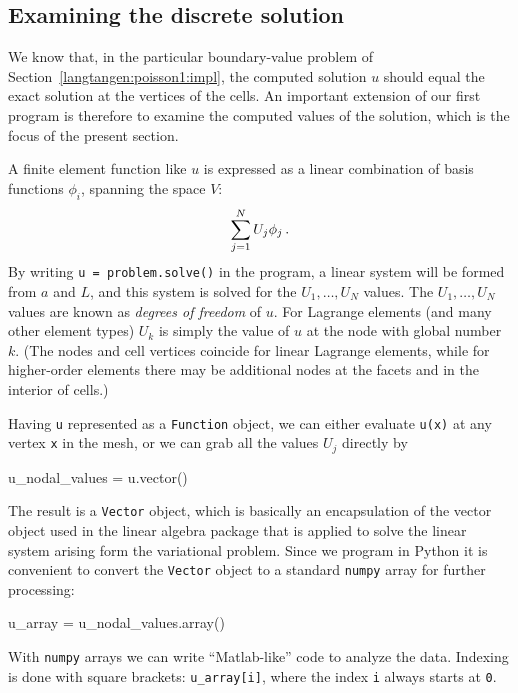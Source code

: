 \subsection{Examining the discrete solution}
\label{langtangen:poisson1:verify1}

We know that, in the particular boundary-value problem of Section~\ref{langtangen:poisson1:impl}, the computed solution $u$ should equal the exact
solution at the vertices of the cells.
An important extension of our first program is therefore to
examine the computed values of the solution, which is the focus of the
present section.

A finite element function like $u$ is expressed as a linear combination
of basis functions $\phi_i$, spanning the space $V$:
\begin{equation}
\sum_{j=1}^N U_j \phi_j\label{langtangen:poisson1:ufem}\thinspace .
\end{equation}
By writing {\fontsize{10pt}{10pt}\verb!u = problem.solve()!} in the program, a linear system
will be formed from $a$ and $L$, and this system is solved for the
$U_1,\ldots,U_N$ values. The $U_1,\ldots,U_N$ values are known
as \emph{degrees of freedom} of $u$. For Lagrange elements (and many other
element types) $U_k$ is simply the value of $u$ at the node 
with global number $k$.
(The nodes and cell vertices coincide for linear Lagrange elements, while
for higher-order elements there may be additional nodes at
the facets and in the interior of cells.)

Having {\fontsize{10pt}{10pt}\texttt{u}} represented as a {\fontsize{10pt}{10pt}\texttt{Function}} object,
we can either evaluate {\fontsize{10pt}{10pt}\texttt{u(x)}} at any vertex {\fontsize{10pt}{10pt}\texttt{x}} in the mesh,
or we can grab all the values
$U_j$ directly by
\begin{python}
u_nodal_values = u.vector()
\end{python}
The result is a \dolfin{} {\fontsize{10pt}{10pt}\verb!Vector!} object, which is basically an
encapsulation of the vector object used in the linear algebra package
that is applied to solve the linear system arising form the
variational problem.
Since we program in Python it is convenient to convert the
{\fontsize{10pt}{10pt}\verb!Vector!} object to a standard {\fontsize{10pt}{10pt}\verb!numpy!} array for further
processing:
\begin{python}
u_array = u_nodal_values.array()
\end{python}
With {\fontsize{10pt}{10pt}\verb!numpy!} arrays we can write ``Matlab-like'' code to analyze
the data. Indexing is done with square brackets: {\fontsize{10pt}{10pt}\verb!u_array[i]!},
where the index {\fontsize{10pt}{10pt}\verb!i!} always starts at {\fontsize{10pt}{10pt}\texttt{0}}.

